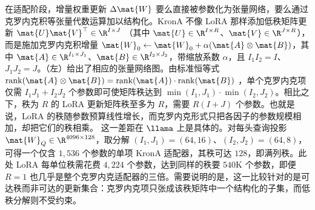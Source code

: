 在适配阶段，增量权重更新 $\Delta \mat{W}$ 要么直接被参数化为张量网络，要么通过克罗内克积等张量代数运算加以结构化。KronA \cite{edalati2022krona} 不像 LoRA 那样添加低秩矩阵更新 $\mat{U}\mat{V}^\top \in\R^{I\times J}$ \cite{hu2022lora}（其中 $\mat{U}\in \R^{I \times R}$、$\mat{V} \in \R^{J \times R}$），而是施加克罗内克积增量 $\mat{W}_0 \leftarrow \mat{W}_0 + \alpha(\mat{A}\otimes\mat{B})$，其中 $\mat{A}\in\R^{I_1\times J_1}$、$\mat{B}\in\R^{I_2\times J_2}$，带缩放系数 $\alpha$，且 $I_1 I_2 = I$、$J_1 J_2 = J$。（左）给出了相应的张量网络图。由标准恒等式 $\mathrm{rank}(\mat{A}\otimes\mat{B})=\mathrm{rank}(\mat{A})\cdot\mathrm{rank}(\mat{B})$ \cite{golubvanloan}，单个克罗内克项仅需 $I_1J_1+I_2J_2$ 个参数即可使矩阵秩达到 $\min(I_1,J_1)\cdot\min(I_2,J_2)$。相比之下，秩为 $R$ 的 LoRA 更新矩阵秩至多为 $R$，需要 $R(I+J)$ 个参数。也就是说，LoRA 的秩随参数预算线性增长，而克罗内克形式只把各因子的参数规模相加，却把它们的秩相乘。
这一差距在 $\llama$ 上是具体的。对每头查询投影 $\mat{W}_Q\in\R^{4096\times 128}$，取分解 $(I_1,J_1)=(64,16)$、$(I_2,J_2)=(64,8)$，可得一个仅含 $1{,}536$ 个参数的单项 KronA 适配器，其秩可达 $128$，即满列秩。此处 LoRA 每单位秩需花费 $4{,}224$ 个参数，达到同样的秩要 $540$K 个参数，即便 $R=1$ 也几乎是整个克罗内克适配器的三倍。需要说明的是，这一比较针对的是可达秩而非可达的更新集合：克罗内克项只张成该秩矩阵中一个结构化的子集，而低秩分解则不受约束。


